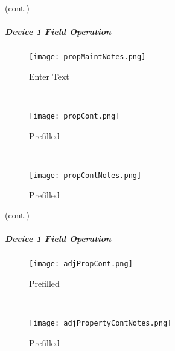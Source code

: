 {\footnotesize (cont.)}
 \vspace{.75in}

 \vspace{2.75in}

 \vspace{2.25in}


 \clearpage

 \subparagraph*{Device 1 Field Operation}

 \begin{wrapfigure}{r}{0.6\textwidth}
 \centering
     \texttt{[image: propMaintNotes.png]}%
 \caption {Enter Text}
 \vspace{.05in}

 \HRule \\[.4cm] %
 \vspace{.1in}

     \texttt{[image: propCont.png]}%
 \caption {Prefilled}
 \vspace{.05in}

 \HRule \\[.4cm] %
 \vspace{.1in}

     \texttt{[image: propContNotes.png]}
 \caption{Prefilled}
 \end{wrapfigure}

 {\footnotesize (cont.)}
 \vspace{.5in}

 \vspace{2.25in}

 \vspace{3.25in}

 \clearpage

 \subparagraph*{Device 1 Field Operation}
 \begin{wrapfigure}{r}{0.6\textwidth}
 \centering
     \texttt{[image: adjPropCont.png]} %
 \caption{Prefilled}
 \vspace{.05in}

 \HRule \\[.4cm] %
 \vspace{.1in}

     \texttt{[image: adjPropertyContNotes.png]}
 \caption{Prefilled}
 \end{wrapfigure}



